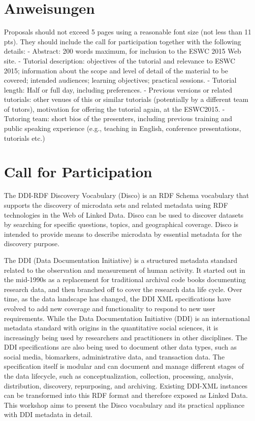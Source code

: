 \documentclass{llncs}
\begin{document}
\section{Anweisungen}

Proposals should not exceed 5 pages using a reasonable font size (not less than 11 pts). They should include the call for participation together with the following details:
- Abstract: 200 words maximum, for inclusion to the ESWC 2015 Web site.
- Tutorial description: objectives of the tutorial and relevance to ESWC 2015; information about the scope and level of detail of the material to be covered; intended audiences; learning objectives; practical sessions.
- Tutorial length: Half or full day, including preferences.
- Previous versions or related tutorials: other venues of this or similar tutorials (potentially by a different team of tutors), motivation for offering the tutorial again, at the ESWC2015.
- Tutoring team: short bios of the presenters, including previous training and public speaking experience (e.g., teaching in English, conference presentations, tutorials etc.)

\section{Call for Participation}

The DDI-RDF Discovery Vocabulary (Disco) is an RDF Schema vocabulary that supports the discovery of microdata sets and related metadata using RDF technologies in the Web of Linked Data. Disco can be used to discover datasets by searching for specific questions, topics, and geographical coverage. Disco is intended to provide means to describe microdata by essential metadata for the discovery purpose.
 
The DDI (Data Documentation Initiative) is a structured metadata standard related to the observation and measurement of human activity.
It started out in the mid-1990s as a replacement for traditional archival code books documenting research data, and then branched off to cover the research data life cycle. Over time, as the data landscape has
changed, the DDI XML specifications have evolved to add new coverage and functionality to respond to new user requirements.
While the Data Documentation Initiative (DDI) is an international metadata standard with origins in the quantitative social sciences, it is increasingly being used by researchers and practitioners in other disciplines. The DDI specifications are also being used to document other data types, such as social media, biomarkers, administrative data, and transaction data. The specification itself is modular and can document and manage different stages of the data lifecycle, such as conceptualization, collection, processing, analysis, distribution, discovery, repurposing, and archiving.
Existing DDI-XML instances can be transformed into this RDF format and therefore exposed as Linked Data. This workshop aims to present the Disco vocabulary and its practical appliance with DDI metadata in detail.
 
\end{document}
